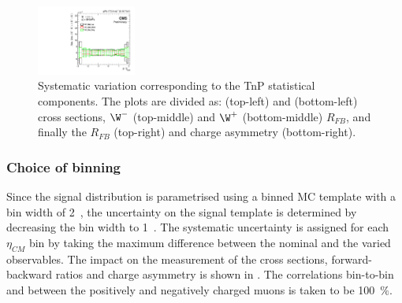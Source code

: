 \begin{figure}[!htbp]
\begin{center}
  \includegraphics[width=0.29\textwidth]{Figures/WBoson/Analysis/Systematics/Combined/PA/Charge_Asymmetry/gr_WToMuInc_PA_Charge_Asymmetry_EffTnP_TnP_Stat.pdf}
 \end{center}
 \caption{Systematic variation corresponding to the TnP statistical components. The plots are divided as: \WToMuNuMi (top-left) and \WToMuNuPl (bottom-left) cross sections, $\W^{-}$ (top-middle) and $\W^{+}$ (bottom-middle) $R_{FB}$, and finally the \W $R_{FB}$ (top-right) and \W charge asymmetry (bottom-right).}
 \label{fig:Systematic_Eff_TnP_Stat}
\end{figure}


\clearpage
\subsubsection{Choice of binning}


Since the \W signal distribution is parametrised using a binned MC template with a bin width of 2~\GeVc, the uncertainty on the signal template is determined by decreasing the bin width to 1~\GeVc. The systematic uncertainty is assigned for each $\eta_{CM}$ bin by taking the maximum difference between the nominal and the varied observables. The impact on the measurement of the cross sections, forward-backward ratios and charge asymmetry is shown in . The correlations bin-to-bin and between the positively and negatively charged muons is taken to be 100~$\%$.

